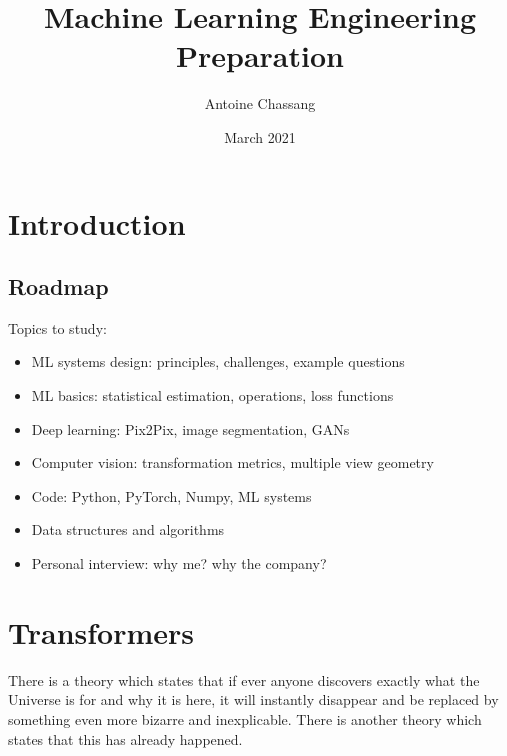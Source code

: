 \documentclass{report}
\title{Machine Learning Engineering Preparation}
\author{Antoine Chassang}
\date{March 2021}
\begin{document}
\maketitle
\tableofcontents
\chapter{Introduction}
    \section{Roadmap}
    Topics to study:
    \begin{itemize}
        \item ML systems design: principles, challenges, example questions
        \item ML basics: statistical estimation, operations, loss functions
        \item Deep learning: Pix2Pix, image segmentation, GANs
        \item Computer vision: transformation metrics, multiple view geometry
        \item Code: Python, PyTorch, Numpy, ML systems
        \item Data structures and algorithms
        \item Personal interview: why me? why the company?
    \end{itemize}

















\chapter{Transformers}
    There is a theory which states that if ever anyone discovers exactly what the Universe is for and why it is here, it will instantly disappear and be replaced by something even more bizarre and inexplicable.
    There is another theory which states that this has already happened.
\end{document}

